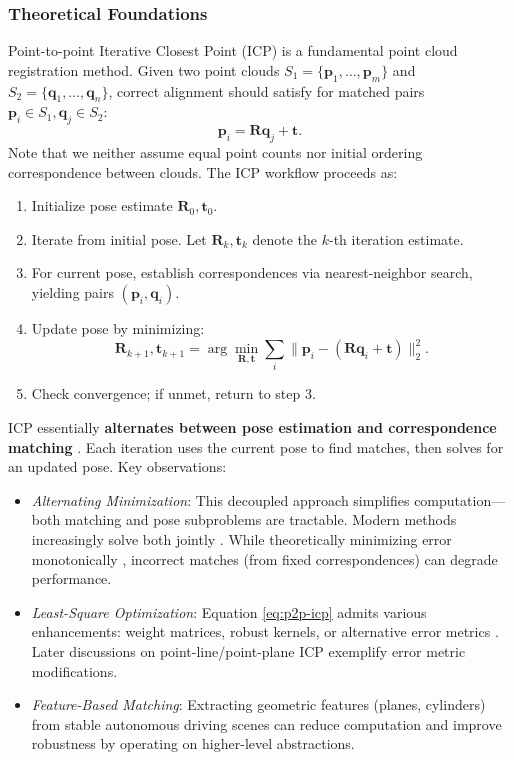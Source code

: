 \subsubsection{Theoretical Foundations}  
Point-to-point Iterative Closest Point (ICP) is a fundamental point cloud registration method. Given two point clouds $S_1=\{\mathbf{p}_1, \ldots, \mathbf{p}_m\}$ and $S_2 = \{\mathbf{q}_1, \ldots, \mathbf{q}_n\}$, correct alignment should satisfy for matched pairs $\mathbf{p}_i \in S_1, \mathbf{q}_j \in S_2$:  
\begin{equation}\label{key}  
	\mathbf{p}_i = \mathbf{R} \mathbf{q}_j + \mathbf{t}.  
\end{equation}  
Note that we neither assume equal point counts nor initial ordering correspondence between clouds. The ICP workflow proceeds as:  
\begin{enumerate}  
	\item Initialize pose estimate $\mathbf{R}_0, \mathbf{t}_0$.  
	\item Iterate from initial pose. Let $\mathbf{R}_k, \mathbf{t}_k$ denote the $k$-th iteration estimate.  
	\item For current pose, establish correspondences via nearest-neighbor search, yielding pairs $(\mathbf{p}_i, \mathbf{q}_i)$.  
	\item Update pose by minimizing:  
	\begin{equation}\label{eq:p2p-icp}  
		\mathbf{R}_{k+1}, \mathbf{t}_{k+1} = \arg \min\limits_{\mathbf{R}, \mathbf{t}} \sum_{i} \| \mathbf{p}_i - (\mathbf{R} \mathbf{q}_i + \mathbf{t}) \|_2^2.  
	\end{equation}  
	\item Check convergence; if unmet, return to step 3.  
\end{enumerate}  

ICP essentially \textbf{alternates between pose estimation and correspondence matching} \cite{Pavlov2018}. Each iteration uses the current pose to find matches, then solves for an updated pose. Key observations:  

\begin{itemize}  
	\item \textit{Alternating Minimization}: This decoupled approach simplifies computation—both matching and pose subproblems are tractable. Modern methods increasingly solve both jointly \cite{Yang2020}. While theoretically minimizing error monotonically \cite{Zhang2021a}, incorrect matches (from fixed correspondences) can degrade performance.  
	\item \textit{Least-Square Optimization}: Equation \eqref{eq:p2p-icp} admits various enhancements: weight matrices, robust kernels, or alternative error metrics \cite{Pottmann2004,Zinser2003,segal2009generalized}. Later discussions on point-line/point-plane ICP \cite{Chen1992} exemplify error metric modifications.  
	\item \textit{Feature-Based Matching}: Extracting geometric features (planes, cylinders) from stable autonomous driving scenes can reduce computation and improve robustness by operating on higher-level abstractions.  
\end{itemize}  

